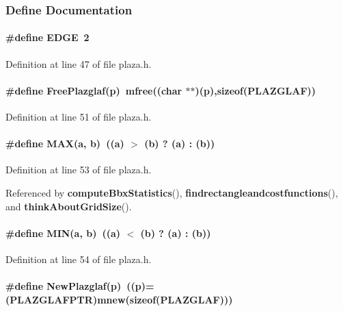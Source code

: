 \subsubsection{Define Documentation}
\label{plaza.h_a0}
\paragraph{\setlength{\rightskip}{0pt plus 5cm}\#define EDGE\ 2}\hfill



Definition at line 47 of file plaza.h.\label{plaza.h_a2}
\paragraph{\setlength{\rightskip}{0pt plus 5cm}\#define Free\-Plazglaf(p)\ mfree((char $\ast$$\ast$)(p),sizeof({\bf PLAZGLAF}))}\hfill



Definition at line 51 of file plaza.h.\label{plaza.h_a3}
\paragraph{\setlength{\rightskip}{0pt plus 5cm}\#define MAX(a, b)\ ((a) $>$ (b) ? (a) : (b))}\hfill



Definition at line 53 of file plaza.h.

Referenced by {\bf compute\-Bbx\-Statistics}(), {\bf findrectangleandcostfunctions}(), and {\bf think\-About\-Grid\-Size}().\label{plaza.h_a4}
\paragraph{\setlength{\rightskip}{0pt plus 5cm}\#define MIN(a, b)\ ((a) $<$ (b) ? (a) : (b))}\hfill



Definition at line 54 of file plaza.h.\label{plaza.h_a1}
\paragraph{\setlength{\rightskip}{0pt plus 5cm}\#define New\-Plazglaf(p)\ ((p)=({\bf PLAZGLAFPTR})mnew(sizeof({\bf PLAZGLAF})))}\hfill



